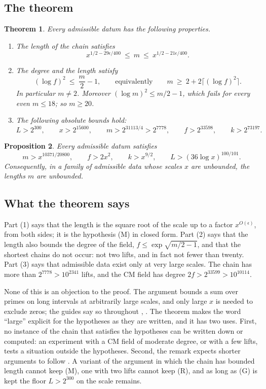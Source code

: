 \documentclass[11pt]{amsart}
\newtheorem{theorem}{Theorem}
\newtheorem{proposition}[theorem]{Proposition}
\theoremstyle{definition}
\theoremstyle{remark}
\newcommand{\tagM}{\textup{(M)}}
\newcommand{\tagR}{\textup{(R)}}
\newcommand{\tagG}{\textup{(G)}}
\begin{document}
\subsection{The theorem}

\begin{theorem}\label{main}
Every admissible datum has the following properties.
\begin{enumerate}
\item The length of the chain satisfies
\[
 x^{1/2-29\epsilon/400}\ \le\ m\ \le\ x^{1/2-21\epsilon/400}.
\]
\item The degree and the length satisfy
\[
 (\log f)^2\ \le\ \frac m2-1,\qquad\text{equivalently}\qquad m\ \ge\ 2+2\bigl\lceil(\log f)^2\bigr\rceil .
\]
In particular $m\ne2$. Moreover $(\log m)^2\le m/2-1$, which fails for every even $m\le18$; so $m\ge20$.
\item The following absolute bounds hold:
\[
 L>2^{300},\qquad x>2^{15600},\qquad m>2^{31113/4}>2^{7778},\qquad f>2^{33598},\qquad k>2^{73197}.
\]
\end{enumerate}
\end{theorem}

\begin{proposition}\label{uniform}
Every admissible datum satisfies
\[
 m>x^{10371/20800},\qquad f>2x^{2},\qquad k>x^{9/2},\qquad L>(36\log x)^{100/101}.
\]
Consequently, in a family of admissible data whose scales $x$ are unbounded, the lengths $m$ are unbounded.
\end{proposition}

\subsection{What the theorem says}
Part (1) says that the length is the square root of the scale up to a factor $x^{O(\epsilon)}$, from both sides; it is the hypothesis \tagM{} in closed form. Part (2) says that the length also bounds the degree of the field, $f\le\exp\sqrt{m/2-1}$, and that the shortest chains do not occur: not two lifts, and in fact not fewer than twenty. Part (3) says that admissible data exist only at very large scales. The chain has more than $2^{7778}>10^{2341}$ lifts, and the CM field has degree $2f>2^{33599}>10^{10114}$.

None of this is an objection to the proof. The argument bounds a sum over primes on long intervals at arbitrarily large scales, and only large $x$ is needed to exclude zeros; the guides say so throughout \cite[p.~4]{Jaswal}, \cite[p.~4]{Zhang}. The theorem makes the word ``large'' explicit for the hypotheses as they are written, and it has two uses. First, no instance of the chain that satisfies the hypotheses can be written down or computed: an experiment with a CM field of moderate degree, or with a few lifts, tests a situation outside the hypotheses. Second, the remark expects shorter arguments to follow \cite[p.~3]{remark}. A variant of the argument in which the chain has bounded length cannot keep \tagM, one with two lifts cannot keep \tagR, and as long as \tagG{} is kept the floor $L>2^{300}$ on the scale remains.
\end{document}

